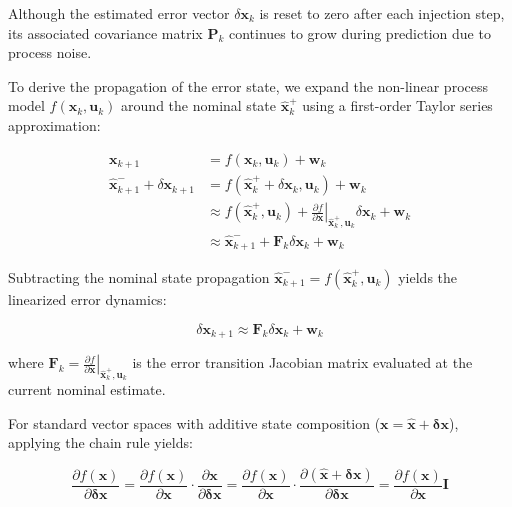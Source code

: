 \documentclass{article}
\begin{document}
	Although the estimated error vector $\delta\mathbf{x}_k$ is reset to zero after each injection step, its associated covariance matrix $\mathbf{P}_k$ continues to grow during prediction due to process noise.
	
	To derive the propagation of the error state, we expand the non-linear process model $f(\mathbf{x}_k, \mathbf{u}_k)$ around the nominal state $\hat{\mathbf{x}}_k^+$ using a first-order Taylor series approximation:
	
	\begin{align}
		\mathbf{x}_{k+1} &= f(\mathbf{x}_k, \mathbf{u}_k) + \mathbf{w}_k \nonumber \\
		\hat{\mathbf{x}}_{k+1}^- + \delta\mathbf{x}_{k+1} &= f(\hat{\mathbf{x}}_k^+ + \delta\mathbf{x}_k, \mathbf{u}_k) + \mathbf{w}_k \nonumber \\
		&\approx f(\hat{\mathbf{x}}_k^+, \mathbf{u}_k) + \left. \frac{\partial f}{\partial \mathbf{x}} \right|_{\hat{\mathbf{x}}_k^+, \mathbf{u}_k} \delta\mathbf{x}_k + \mathbf{w}_k \\
		&\approx \hat{\mathbf{x}}_{k+1}^- + \mathbf{F}_k \delta\mathbf{x}_k + \mathbf{w}_k
	\end{align}
	
	Subtracting the nominal state propagation $\hat{\mathbf{x}}_{k+1}^- = f(\hat{\mathbf{x}}_k^+, \mathbf{u}_k)$ yields the linearized error dynamics:
	
	\begin{equation}
		\delta\mathbf{x}_{k+1} \approx \mathbf{F}_k \delta\mathbf{x}_k + \mathbf{w}_k
	\end{equation}
	
	where $\mathbf{F}_k = \left. \frac{\partial f}{\partial \mathbf{x}} \right|_{\hat{\mathbf{x}}_k^+, \mathbf{u}_k}$ is the error transition Jacobian matrix evaluated at the current nominal estimate.
	
	For standard vector spaces with additive state composition ($\mathbf{x} = \hat{\mathbf{x}} + \boldsymbol{\delta\mathbf{x}}$), applying the chain rule yields:
	
	\begin{equation*}
		\frac{\partial f(\mathbf{x})}{\partial \boldsymbol{\delta\mathbf{x}}} = \frac{\partial f(\mathbf{x})}{\partial \mathbf{x}} \cdot \frac{\partial \mathbf{x}}{\partial \boldsymbol{\delta\mathbf{x}}} = \frac{\partial f(\mathbf{x})}{\partial \mathbf{x}} \cdot \frac{\partial (\hat{\mathbf{x}} + \boldsymbol{\delta\mathbf{x}})}{\partial \boldsymbol{\delta\mathbf{x}}} = \frac{\partial f(\mathbf{x})}{\partial \mathbf{x}} \mathbf{I}
	\end{equation*}
	
\end{document}
